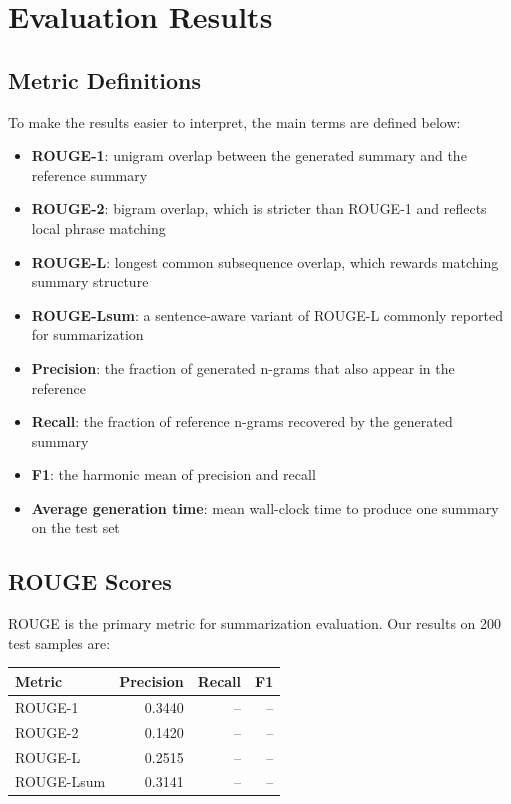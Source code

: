 \documentclass[12pt,a4paper,oneside]{report}
\begin{document}
\section{Evaluation Results}

\subsection{Metric Definitions}
To make the results easier to interpret, the main terms are defined below:
\begin{itemize}
    \item \textbf{ROUGE-1}: unigram overlap between the generated summary and the reference summary
    \item \textbf{ROUGE-2}: bigram overlap, which is stricter than ROUGE-1 and reflects local phrase matching
    \item \textbf{ROUGE-L}: longest common subsequence overlap, which rewards matching summary structure
    \item \textbf{ROUGE-Lsum}: a sentence-aware variant of ROUGE-L commonly reported for summarization
    \item \textbf{Precision}: the fraction of generated n-grams that also appear in the reference
    \item \textbf{Recall}: the fraction of reference n-grams recovered by the generated summary
    \item \textbf{F1}: the harmonic mean of precision and recall
    \item \textbf{Average generation time}: mean wall-clock time to produce one summary on the test set
\end{itemize}

\subsection{ROUGE Scores}
ROUGE is the primary metric for summarization evaluation. Our results on 200 test samples are:

\begin{table}[H]
\centering
\begin{tabular}{lrrr}
\toprule
\textbf{Metric} & \textbf{Precision} & \textbf{Recall} & \textbf{F1} \\
\midrule
ROUGE-1 & 0.3440 & -- & -- \\
ROUGE-2 & 0.1420 & -- & -- \\
ROUGE-L & 0.2515 & -- & -- \\
ROUGE-Lsum & 0.3141 & -- & -- \\
\bottomrule
\end{tabular}
\end{table}
\end{document}
